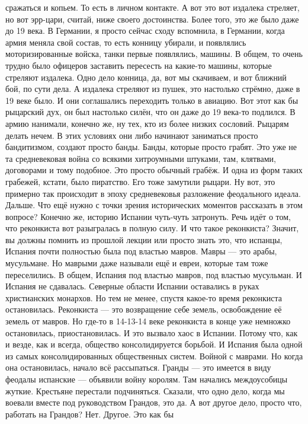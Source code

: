 сражаться и копьем. То есть в личном контакте. А вот это вот издалека стреляет,
но вот эрр-цари, считай, ниже своего достоинства. Более того, это же было даже
до 19 века. В Германии, я просто сейчас сходу вспомнила, в Германии, когда армия
меняла свой состав, то есть конницу убирали, и появлялись моторизированные
войска, танки первые появлялись, машины. В общем, то очень трудно было офицеров
заставить пересесть на какие-то машины, которые стреляют издалека. Одно дело
конница, да, вот мы скачиваем, и вот ближний бой, по сути дела. А издалека
стреляют из пушек, это настолько стрёмно, даже в 19 веке было. И они соглашались
переходить только в авиацию. Вот этот как бы рыцарский дух, он был настолько
силён, что он даже до 19 века-то подлился. В армию нанимали, конечно же, ну тех,
кто из более низких сословий. Рыцарям делать нечем. В этих условиях они либо
начинают заниматься просто бандитизмом, создают просто банды. Банды, которые
просто грабят. Это уже не та средневековая война со всякими хитроумными штуками,
там, клятвами, договорами и тому подобное. Это просто обычный грабёж. И одна из
форм таких грабежей, кстати, было пиратство. Его тоже замутили рыцари. Ну вот,
это примерно так происходит в эпоху средневековья разложение феодального идеала.
Дальше. Что ещё нужно с точки зрения исторических моментов рассказать в этом
вопросе? Конечно же, историю Испании чуть-чуть затронуть. Речь идёт о том, что
реконкиста вот разыгралась в полную силу. И что такое реконкиста? Значит, вы
должны помнить из прошлой лекции или просто знать это, что испанцы, Испания
почти полностью была под властью мавров. Мавры — это арабы, мусульмане. Но
маврыми даже называли ещё и евреи, которые там тоже переселились. В общем,
Испания под властью мавров, под властью мусульман. И Испания не сдавалась.
Северные области Испании оставались в руках христианских монархов. Но тем не
менее, спустя какое-то время реконкиста остановилась. Реконкиста — это
возвращение себе земель, освобождение её земель от мавров. Но где-то в 14-13-14
веке реконкиста в конце уже немножко остановилась, приостановилась. И это
вызвало хаос в Испании. Потому что, как и везде, как и всегда, общество
консолидируется борьбой. И Испания была одной из самых консолидированных
общественных систем. Войной с маврами. Но когда она остановилась, начало всё
рассыпаться. Гранды — это имеется в виду феодалы испанские — объявили войну
королям. Там начались междоусобицы жуткие. Крестьяне перестали подчиняться.
Сказали, что одно дело, когда мы воевали вместе под руководством Грандов, это
да. А вот другое дело, просто что, работать на Грандов? Нет. Другое. Это как бы
